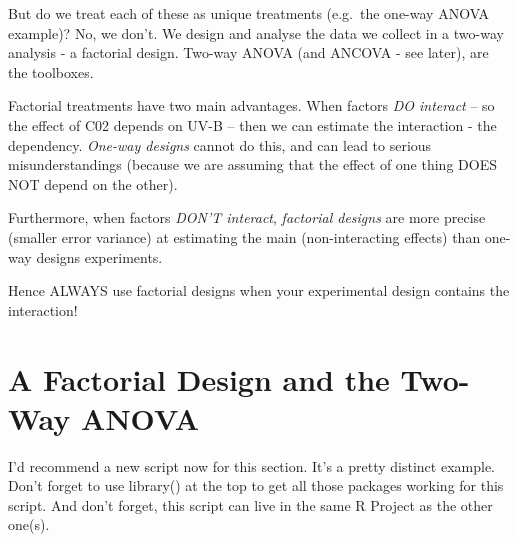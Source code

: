 \documentclass[
]{book}
\newenvironment{Shaded}{\begin{snugshade}}{\end{snugshade}}
\newcommand{\AttributeTok}[1]{\textcolor[rgb]{0.77,0.63,0.00}{#1}}
\newcommand{\CommentTok}[1]{\textcolor[rgb]{0.56,0.35,0.01}{\textit{#1}}}
\newcommand{\DecValTok}[1]{\textcolor[rgb]{0.00,0.00,0.81}{#1}}
\newcommand{\FunctionTok}[1]{\textcolor[rgb]{0.00,0.00,0.00}{#1}}
\newcommand{\NormalTok}[1]{#1}
\newcommand{\OtherTok}[1]{\textcolor[rgb]{0.56,0.35,0.01}{#1}}
\newcommand{\SpecialCharTok}[1]{\textcolor[rgb]{0.00,0.00,0.00}{#1}}
\newcommand{\StringTok}[1]{\textcolor[rgb]{0.31,0.60,0.02}{#1}}
\begin{document}
But do we treat each of these as unique treatments (e.g.~the one-way ANOVA example)? No, we don't. We design and analyse the data we collect in a two-way analysis - a factorial design. Two-way ANOVA (and ANCOVA - see later), are the toolboxes.

Factorial treatments have two main advantages. When factors \emph{DO interact} -- so the effect of C02 depends on UV-B -- then we can estimate the interaction - the dependency. \emph{One-way designs} cannot do this, and can lead to serious misunderstandings (because we are assuming that the effect of one thing DOES NOT depend on the other).

Furthermore, when factors \emph{DON'T interact}, \emph{factorial designs} are more precise (smaller error variance) at estimating the main (non-interacting effects) than one-way designs experiments.

Hence ALWAYS use factorial designs when your experimental design contains the interaction!

\hypertarget{a-factorial-design-and-the-two-way-anova}{%
\section{A Factorial Design and the Two-Way ANOVA}\label{a-factorial-design-and-the-two-way-anova}}

I'd recommend a new script now for this section. It's a pretty distinct example. Don't forget to use library() at the top to get all those packages working for this script. And don't forget, this script can live in the same R Project as the other one(s).

\begin{Shaded}
\end{Shaded}
\end{document}

